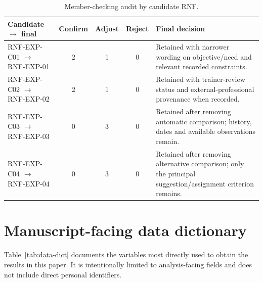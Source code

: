 \documentclass[pdflatex,sn-basic]{sn-jnl}
\begin{document}
\begin{table}[H]
\caption{Member-checking audit by candidate RNF.}\label{tab:mc-audit}
\centering\footnotesize
\begin{tabularx}{\textwidth}{@{}p{2.3cm}cccX@{}}
\toprule
Candidate $\rightarrow$ final & Confirm & Adjust & Reject & Final decision \\
\midrule
RNF-EXP-C01 $\rightarrow$ RNF-EXP-01 & 2 & 1 & 0 & Retained with narrower wording on objective/need and relevant recorded constraints.\\
RNF-EXP-C02 $\rightarrow$ RNF-EXP-02 & 2 & 1 & 0 & Retained with trainer-review status and external-professional provenance when recorded.\\
RNF-EXP-C03 $\rightarrow$ RNF-EXP-03 & 0 & 3 & 0 & Retained after removing automatic comparison; history, dates and available observations remain.\\
RNF-EXP-C04 $\rightarrow$ RNF-EXP-04 & 0 & 3 & 0 & Retained after removing alternative comparison; only the principal suggestion/assignment criterion remains.\\
\bottomrule
\end{tabularx}
\end{table}


\section{Manuscript-facing data dictionary}\label{app:data-dict}
Table~\ref{tab:data-dict} documents the variables most directly used to obtain the results in this paper. It is intentionally limited to analysis-facing fields and does not include direct personal identifiers.
\end{document}
